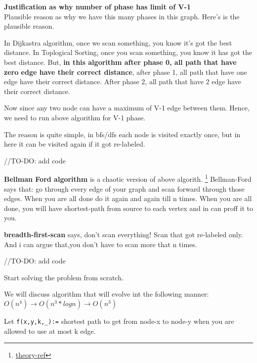 \textbf{Justification as why number of phase has limit of V-1}\\
Plausible reason as why we have this many phases in this graph. Here's is the plausible reason.

In Dijkastra algorithm, once we scan something, you know it's got the best distance. In Toplogical Sorting, once you scan something, you know it has got the best distance. But, \textbf{in this algorithm after phase 0, all path that have zero edge have their correct distance}, after phase 1, all path that have one edge have their correct distance. After phase 2, all path that have 2 edge have their correct distance.

Now since any two node can have a maximum of V-1 edge between them. Hence, we need to run above algorithm for V-1 phase.

 The reason is quite simple, in bfs/dfs each node is visited exactly once, but in here it can be visited again if it got re-labeled.

\begin{code3}
    //TO-DO: add code
\end{code3}

\textbf{Bellman Ford algorithm} is a chaotic version of above algorith. \footnote{\href{https://youtu.be/XIAQRlNkJAw?t=2335}{theory-ref}} 
Bellman-Ford says that: go through every edge of your graph and scan forward through those edges. When you are all done do it again and again till n times. When you are all done, you will have shortest-path from source to each vertex and in can proff it to you.

\textbf{breadth-first-scan} says, don't scan everything! Scan that got re-labeled only. And i can argue that,you don't have to scan more that n times.

\begin{code3}
    //TO-DO: add code
\end{code3}



Start solving the problem from scratch.

We will discuss algorithm that will evolve int the following manner:
$O(n^4) \rightarrow O(n^3*log n) \rightarrow O(n^3) $

Let \verb|f(x,y,k,_):=| shortest path to get from node-x to node-y when you are allowed to use at most k edge.


